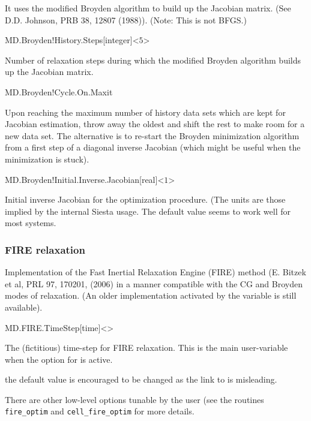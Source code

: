 It uses the modified Broyden algorithm to
build up the Jacobian matrix. (See D.D. Johnson, PRB 38, 12807
(1988)). (Note: This is not BFGS.)

\begin{fdfentry}{MD.Broyden!History.Steps}[integer]<$5$>

  Number of relaxation steps during which the modified Broyden
  algorithm builds up the Jacobian matrix.

\end{fdfentry}

\begin{fdflogicalT}{MD.Broyden!Cycle.On.Maxit}

  Upon reaching the maximum number of history data sets which are kept
  for Jacobian estimation, throw away the oldest and shift the rest to
  make room for a new data set. The alternative is to re-start the
  Broyden minimization algorithm from a first step of a diagonal
  inverse Jacobian (which might be useful when the minimization is
  stuck).

\end{fdflogicalT}

\begin{fdfentry}{MD.Broyden!Initial.Inverse.Jacobian}[real]<$1$>

  Initial inverse Jacobian for the optimization procedure. (The units
  are those implied by the internal Siesta usage. The default value
  seems to work well for most systems.

\end{fdfentry}



\subsubsection{FIRE relaxation}

Implementation of the Fast Inertial Relaxation Engine (FIRE) method
(E. Bitzek et al, PRL 97, 170201, (2006) in a manner compatible with
the CG and Broyden modes of relaxation. (An older implementation
activated by the  variable is still available).

\begin{fdfentry}{MD.FIRE.TimeStep}[time]<>
  
  The (fictitious) time-step for FIRE relaxation.  This is the main
  user-variable when the option  for
   is active.

  \note the default value is encouraged to be changed as the link to
   is misleading.

  There are other low-level options tunable by the user (see the
  routines \texttt{fire\_optim} and \texttt{cell\_fire\_optim} for
  more details.

\end{fdfentry}


